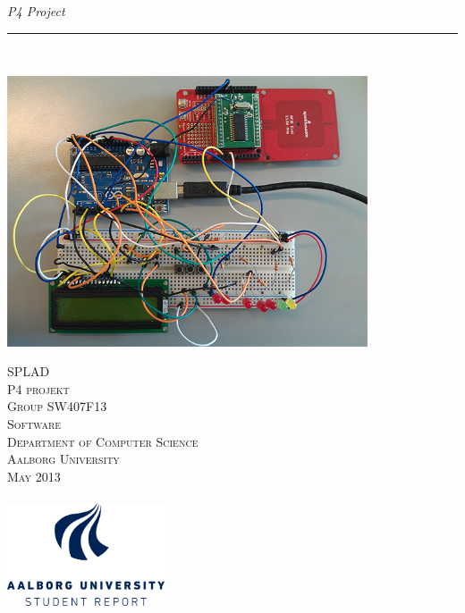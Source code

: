 \thispagestyle{empty}
\begin{flushright}
\vspace{3cm}

\phantom{hul}

\phantom{hul}

\phantom{hul}

\textsl{P4 Project} \\ \vspace{1cm}

\rule{0.8\textwidth}{3mm} \\ \vspace{1.5cm}

\includegraphics[width=0.8\textwidth]{billeder/HardwareSetup.png}

\vspace{1.5cm} 
\textsc{\Large SPLAD \\
P4 projekt\\
Group SW407F13\\
Software\\
Department of Computer Science\\
Aalborg University\\
May 2013\\
~\\
}
\includegraphics[width=0.35\textwidth]{billeder/AAUUKSTUDENTREPORTbluergb.png}
\end{flushright}
